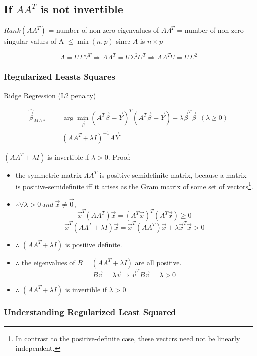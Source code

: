 \documentclass[letterpaper,10pt]{article}
\begin{document}
\subsection{If $AA^T$ is not invertible}

$Rank(AA^T)$ = number of non-zero eigenvalues of $AA^T$ = number of non-zero singular values of A $\leq \min(n,p)$ since $A$ is $n\times p$

$$A=U \Sigma V^T \Rightarrow AA^T=U\Sigma^2U^T \Rightarrow AA^T U = U\Sigma^2$$

\subsubsection{Regularized Leasts Squares}

Ridge Regression (L2 penalty)

\begin{equation}
\begin{array}{rcl}
\hat{\vec{\beta}}_{MAP} & = & \arg\min_{\vec{\beta}}(A^T\vec{\beta}-\vec{Y})^T(A^T\vec{\beta}-\vec{Y}) +\lambda \vec{\beta}^T\vec{\beta}~~(\lambda \geq 0) \\
& = & (AA^T + \lambda I)^{-1} A\vec{Y}
\end{array}
\end{equation}

$(AA^T + \lambda I)$ is invertible if $\lambda > 0$. Proof:
\begin{itemize}
	\item the symmetric matrix $AA^T$ is positive-semidefinite matrix, because a matrix is positive-semidefinite iff it arises as the Gram matrix of some set of vectors\footnote{In contrast to the positive-definite case, these vectors need not be linearly independent.}.
	\item $\therefore \forall \lambda>0~and~\vec{x}\neq\vec{0}$, 
	$$\vec{x}^T(AA^T)\vec{x} = (A^T\vec{x})^T(A^T\vec{x}) \geq 0$$
	$$\vec{x}^T(AA^T+\lambda I)\vec{x} = \vec{x}^T (AA^T) \vec{x} + \lambda \vec{x}^T\vec{x} >0$$
	\item $\therefore$ $(AA^T+\lambda I)$ is positive definite.
	\item $\therefore$ the eigenvalues of $B=(AA^T+\lambda I)$ are all positive. $$B\vec{v}=\lambda\vec{v} \Rightarrow \vec{v}^T B \vec{v} = \lambda >0$$
	\item $\therefore$ $(AA^T + \lambda I)$ is invertible if $\lambda > 0$
\end{itemize}

\subsubsection{Understanding Regularized Least Squared}
\end{document}
